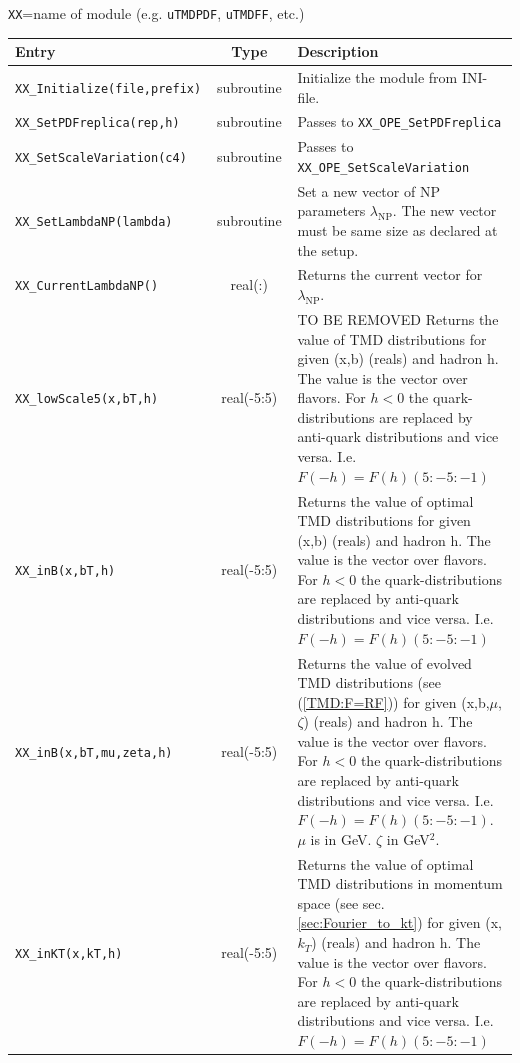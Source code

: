 \documentclass[prd,nofootinbib,eqsecnum,final]{revtex4}
\renewcommand{\(}{\left(}
\renewcommand{\)}{\right)}
\renewcommand{\[}{\left[}
\renewcommand{\]}{\right]}
\newcommand{\red}[1]{{\color[rgb]{1,0,0} #1}}
\newcommand{\blue}[1]{{\color{blue} #1}}
\begin{document}
\begin{center}
\texttt{XX}=name of module (e.g. \texttt{uTMDPDF}, \texttt{uTMDFF}, etc.)
\\
\begin{tabular}{||p{5.5cm}||c||p{8.5cm}||}
\hline\hline
Entry &~~Type~~& Description
\\\hline
\texttt{XX\_Initialize(file,prefix)} & subroutine & Initialize the module from INI-file.
\\\hline
\texttt{XX\_SetPDFreplica(rep,h)} & subroutine & Passes to \texttt{XX\_OPE\_SetPDFreplica}
\\\hline
\texttt{XX\_SetScaleVariation(c4)} & subroutine & Passes to \texttt{XX\_OPE\_SetScaleVariation}
\\\hline
\texttt{XX\_SetLambdaNP(lambda)} & subroutine & Set a new vector of NP parameters $\lambda_{\text{NP}}$. The new vector must be same size as declared at the setup.
\\\hline
\texttt{XX\_CurrentLambdaNP()} & real(:) & Returns the current vector for $\lambda_{\text{NP}}$.
\\\hline\hline
\texttt{XX\_lowScale5(x,bT,h)} & real(-5:5) & \red{TO BE REMOVED} Returns the value of TMD distributions for given (x,b) (reals) and hadron h. The value is the vector over flavors. For $h<0$ the quark-distributions are replaced by anti-quark distributions and vice versa. I.e. $F(-h)=F(h)(5:-5:-1)$
\\\hline\hline
\texttt{XX\_inB(x,bT,h)} & real(-5:5) & Returns the value of \blue{optimal} TMD distributions for given (x,b) (reals) and hadron h. The value is the vector over flavors. For $h<0$ the quark-distributions are replaced by anti-quark distributions and vice versa. I.e. $F(-h)=F(h)(5:-5:-1)$
\\\hline
\texttt{XX\_inB(x,bT,mu,zeta,h)} & real(-5:5) & Returns the value of \blue{evolved} TMD distributions (see (\ref{TMD:F=RF})) for given (x,b,$\mu$,$\zeta$) (reals) and hadron h. The value is the vector over flavors. For $h<0$ the quark-distributions are replaced by anti-quark distributions and vice versa. I.e. $F(-h)=F(h)(5:-5:-1)$. $\mu$ is in GeV. $\zeta$ in GeV$^2$.
\\\hline
\texttt{XX\_inKT(x,kT,h)} & real(-5:5) & Returns the value of \blue{optimal} TMD distributions \blue{in momentum space} (see sec.\ref{sec:Fourier_to_kt}) for given (x,$k_T$) (reals) and hadron h. The value is the vector over flavors. For $h<0$ the quark-distributions are replaced by anti-quark distributions and vice versa. I.e. $F(-h)=F(h)(5:-5:-1)$
\\\hline

\end{tabular}
\end{center}
\end{document}
